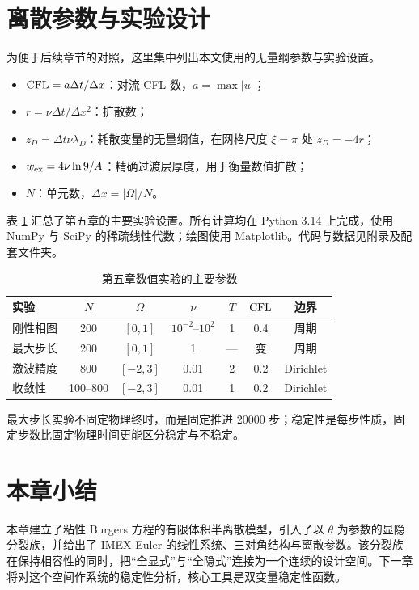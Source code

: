 \section{离散参数与实验设计}
\label{sec:parameters}

为便于后续章节的对照，这里集中列出本文使用的无量纲参数与实验设置。

\begin{itemize}[leftmargin=2.2em]
  \item $\mathrm{CFL}=a\Delta t/\Delta x$：对流 CFL 数，$a=\max|u|$；
  \item $r=\nu\Delta t/\Delta x^2$：扩散数；
  \item $z_D=\Delta t\nu\lambda_D$：耗散变量的无量纲值，在网格尺度 $\xi=\pi$ 处 $z_D=-4r$；
  \item $w_{\rm ex}=4\nu\ln9/A$：精确过渡层厚度，用于衡量数值扩散；
  \item $N$：单元数，$\Delta x=|\Omega|/N$。
\end{itemize}

表 \ref{tab:experiment-setup} 汇总了第五章的主要实验设置。所有计算均在 Python 3.14 上完成，使用 NumPy 与 SciPy 的稀疏线性代数；绘图使用 Matplotlib。代码与数据见附录及配套文件夹。

\begin{table}[H]
  \centering
  \caption{第五章数值实验的主要参数}
  \label{tab:experiment-setup}
  \begin{tabular}{lcccccc}
    \toprule
    实验 & $N$ & $\Omega$ & $\nu$ & $T$ & $\mathrm{CFL}$ & 边界 \\
    \midrule
    刚性相图 & 200 & $[0,1]$ & $10^{-2}$--$10^{2}$ & 1 & 0.4 & 周期 \\
    最大步长 & 200 & $[0,1]$ & 1 & --- & 变 & 周期 \\
    激波精度 & 800 & $[-2,3]$ & 0.01 & 2 & 0.2 & Dirichlet \\
    收敛性 & 100--800 & $[-2,3]$ & 0.01 & 1 & 0.2 & Dirichlet \\
    \bottomrule
  \end{tabular}
\end{table}

最大步长实验不固定物理终时，而是固定推进 20000 步；稳定性是每步性质，固定步数比固定物理时间更能区分稳定与不稳定。

\section{本章小结}

本章建立了粘性 Burgers 方程的有限体积半离散模型，引入了以 $\theta$ 为参数的显隐分裂族，并给出了 IMEX-Euler 的线性系统、三对角结构与离散参数。该分裂族在保持相容性的同时，把“全显式”与“全隐式”连接为一个连续的设计空间。下一章将对这个空间作系统的稳定性分析，核心工具是双变量稳定性函数。
